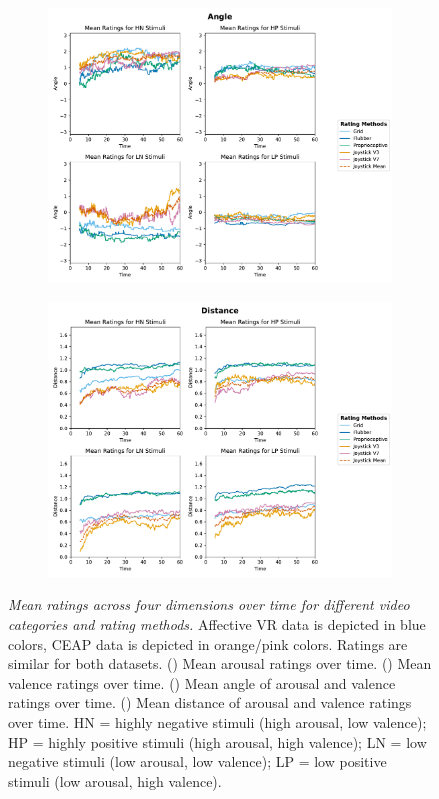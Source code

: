 \documentclass[11pt, letterpaper]{article}
\begin{document}
\begin{figure}
    \vspace{1cm}
    \begin{subfigure}[t]{0.49\textwidth}
    \centering
        \includegraphics[width=\linewidth]{cr_angle} 
        \caption{} \label{fig:cr_angle}
    \end{subfigure}
    \hfill
    \begin{subfigure}[t]{0.49\textwidth}
    \centering
        \includegraphics[width=\linewidth]{cr_dist} 
        \caption{} \label{fig:cr_dist}
    \end{subfigure}
    \caption{\textit{Mean ratings across four dimensions over time for different video categories and rating methods.} Affective VR data is depicted in blue colors, CEAP data is depicted in orange/pink colors. Ratings are similar for both datasets. () Mean arousal ratings over time. () Mean valence ratings over time. () Mean angle of arousal and valence ratings over time. () Mean distance of arousal and valence ratings over time. HN = highly negative stimuli (high arousal, low valence); HP = highly positive stimuli (high arousal, high valence); LN = low negative stimuli (low arousal, low valence); LP = low positive stimuli (low arousal, high valence).}

\end{figure}
\end{document}
